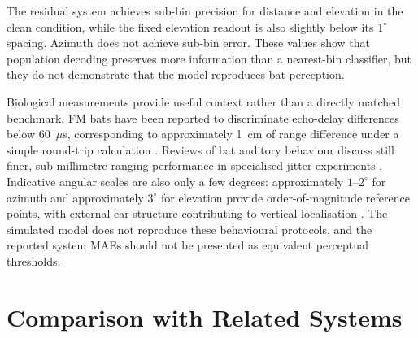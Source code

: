 \begin{table}[h]
    \centering
    \caption{Population resolution and clean-condition readout error. Residual-SNN values are system-level results after fusion and should not be interpreted as the acuity of one pathway alone.}
    \label{tab:population_resolution}
    \small
\end{table}

The residual system achieves sub-bin precision for distance and elevation in the clean condition, while the fixed elevation readout is also slightly below its $1^\circ$ spacing. Azimuth does not achieve sub-bin error. These values show that population decoding preserves more information than a nearest-bin classifier, but they do not demonstrate that the model reproduces bat perception.

Biological measurements provide useful context rather than a directly matched benchmark. FM bats have been reported to discriminate echo-delay differences below 60~$\mu$s, corresponding to approximately 1~cm of range difference under a simple round-trip calculation \cite{Simmons1973TheBats}. Reviews of bat auditory behaviour discuss still finer, sub-millimetre ranging performance in specialised jitter experiments \cite{Ulanovsky2008WhatBrain}. Indicative angular scales are also only a few degrees: approximately $1$--$2^\circ$ for azimuth and approximately $3^\circ$ for elevation provide order-of-magnitude reference points, with external-ear structure contributing to vertical localisation \cite{Ulanovsky2008WhatBrain,Lawrence1982EcholocationTargets}. The simulated model does not reproduce these behavioural protocols, and the reported system MAEs should not be presented as equivalent perceptual thresholds.

\section{Comparison with Related Systems}


